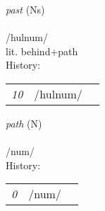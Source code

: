 \vspace{15pt}
\begin{nopagebreak}
 \textit{past} (Ns)\\
\\
\noindent /h{\textprimstress}ulnum/\\
\noindent lit. behind+path\\


\noindent History:

\vspace{-0pt}
\hspace{40pt}
\begin{tabular}{ccc}
\textit{10} & /hulnum/& \\
\end{tabular}

\vspace{20pt}\hline

\end{nopagebreak}
\filbreak



\vspace{15pt}
\begin{nopagebreak}
 \textit{path} (N)\\
\\
\noindent /n{\textprimstress}um/\\


\noindent History:

\vspace{-0pt}
\hspace{40pt}
\begin{tabular}{ccc}
\textit{0} & /num/& \\
\end{tabular}

\vspace{20pt}\hline

\end{nopagebreak}
\filbreak



